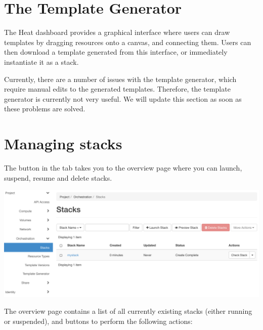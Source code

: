 \section{The Template Generator}\label{sec:template-generator}
The Heat dashboard provides a graphical interface where users can draw
templates by dragging resources onto a canvas, and connecting them.
Users can then download a template generated from this interface, or
immediately instantiate it as a stack.

 Currently, there are a number of issues with the
template generator, which require manual edits to the generated
templates.  Therefore, the template generator is currently not very
useful.  We will update this section as soon as these problems are
solved.

\section{Managing stacks}\label{sec:managing-stacks}
The  button in the  tab takes you
to the overview page where you can launch, suspend, resume and delete
stacks.
\begin{center}
  \includegraphics[width=\textwidth]{img/stacks_overview}
\end{center}
The overview page contains a list of all currently existing stacks
(either running or suspended), and buttons to perform the following
actions:

